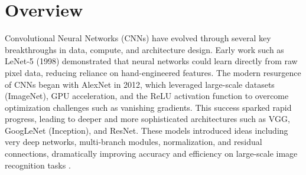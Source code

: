 \documentclass{article}
\begin{document}





\section{Overview}
Convolutional Neural Networks (CNNs) have evolved through several key breakthroughs in data, compute, and architecture design. Early work such as LeNet-5 (1998) demonstrated that neural networks could learn directly from raw pixel data, reducing reliance on hand-engineered features. The modern resurgence of CNNs began with AlexNet in 2012, which leveraged large-scale datasets (ImageNet), GPU acceleration, and the ReLU activation function to overcome optimization challenges such as vanishing gradients. This success sparked rapid progress, leading to deeper and more sophisticated architectures such as VGG, GoogLeNet (Inception), and ResNet. These models introduced ideas including very deep networks, multi-branch modules, normalization, and residual connections, dramatically improving accuracy and efficiency on large-scale image recognition tasks \cite{726791,NIPS2012_c399862d,simonyan2015deepconvolutionalnetworkslargescale,szegedy2014goingdeeperconvolutions,he2015deepresiduallearningimage,alregib2024neural}.
\end{document}
